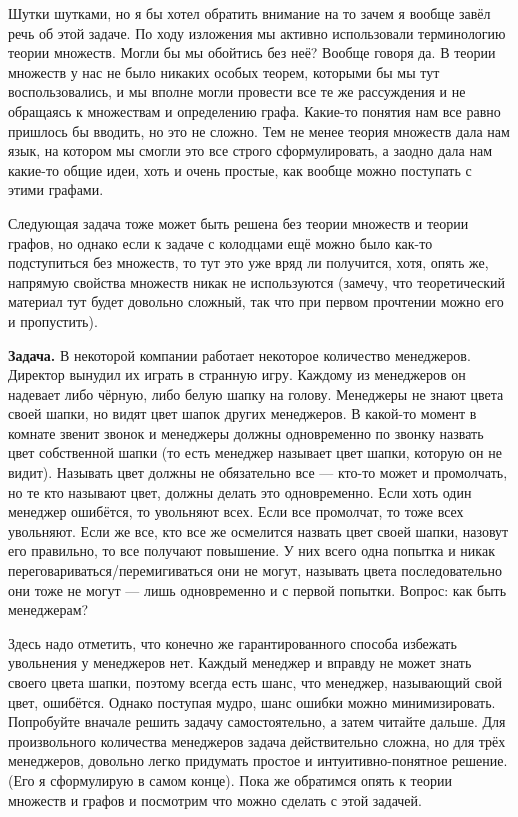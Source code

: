 Шутки шутками, но я бы хотел обратить внимание на то зачем я вообще завёл речь об этой задаче. По ходу изложения мы активно использовали терминологию теории множеств. Могли бы мы обойтись без неё? Вообще говоря да. В теории множеств у нас не было никаких особых теорем, которыми бы мы тут воспользовались, и мы вполне могли провести все те же рассуждения и не обращаясь к множествам и определению графа. Какие-то понятия нам все равно пришлось бы вводить, но это не сложно. Тем не менее теория множеств дала нам язык, на котором мы смогли это все строго сформулировать, а заодно дала нам какие-то общие идеи, хоть и очень простые, как вообще можно поступать с этими графами.

Следующая задача тоже может быть решена без теории множеств и теории графов, но однако если к задаче с колодцами ещё можно было как-то подступиться без множеств, то тут это уже вряд ли получится, хотя, опять же, напрямую свойства множеств никак не используются (замечу, что теоретический материал тут будет довольно сложный, так что при первом прочтении можно его и пропустить).

{\bfseries Задача.} В некоторой компании работает некоторое количество менеджеров. Директор вынудил их играть в странную игру. Каждому из менеджеров он надевает либо чёрную, либо белую шапку на голову. Менеджеры не знают цвета своей шапки, но видят цвет шапок других менеджеров. В какой-то момент в комнате звенит звонок и менеджеры должны одновременно по звонку назвать цвет собственной шапки (то есть менеджер называет цвет шапки, которую он не видит). Называть цвет должны не обязательно все — кто-то может и промолчать, но те кто называют цвет, должны делать это одновременно. Если хоть один менеджер ошибётся, то увольняют всех.  Если все промолчат, то тоже всех увольняют. Если же все, кто все же осмелится назвать цвет своей шапки, назовут его правильно, то все получают повышение. У них всего одна попытка и никак переговариваться/перемигиваться они не могут, называть цвета последовательно они тоже не могут — лишь одновременно и с первой попытки. Вопрос: как быть менеджерам?

Здесь надо отметить, что конечно же гарантированного способа избежать увольнения у менеджеров нет. Каждый менеджер и вправду не может знать своего цвета шапки, поэтому всегда есть шанс, что менеджер, называющий свой цвет, ошибётся. Однако поступая мудро, шанс ошибки можно минимизировать. Попробуйте вначале решить задачу самостоятельно, а затем читайте дальше. Для произвольного количества менеджеров задача действительно сложна, но для трёх менеджеров, довольно легко придумать простое и интуитивно-понятное решение. (Его я сформулирую в самом конце). Пока же обратимся опять к теории множеств и графов и посмотрим что можно сделать с этой задачей.

